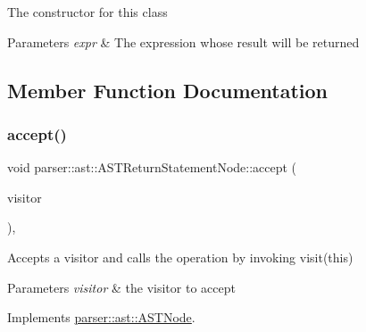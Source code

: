 The constructor for this class 
\begin{DoxyParams}{Parameters}
{\em expr} & The expression whose result will be returned \\
\hline
\end{DoxyParams}


\subsection{Member Function Documentation}
\mbox{\label{classparser_1_1ast_1_1ASTReturnStatementNode_ac66c375bc67277468711fdec08e93b15}} 
\subsubsection{\texorpdfstring{accept()}{accept()}}
{\footnotesize\ttfamily void parser\+::ast\+::\+A\+S\+T\+Return\+Statement\+Node\+::accept (\begin{DoxyParamCaption}\item[{\hyperlink{classvisitor_1_1Visitor}{visitor\+::\+Visitor} $\ast$}]{visitor }\end{DoxyParamCaption})\hspace{0.3cm}{\ttfamily [override]}, {\ttfamily [virtual]}}

Accepts a visitor and calls the operation by invoking {\ttfamily visit(this)} 
\begin{DoxyParams}{Parameters}
{\em visitor} & the visitor to accept \\
\hline
\end{DoxyParams}


Implements \hyperlink{classparser_1_1ast_1_1ASTNode_a3ff84fdfdbbc5c39b70b4d04c22e7dc3}{parser\+::ast\+::\+A\+S\+T\+Node}.

\mbox{\label{classparser_1_1ast_1_1ASTReturnStatementNode_a6e10c7499773278d36493d9a9545438a}} 
